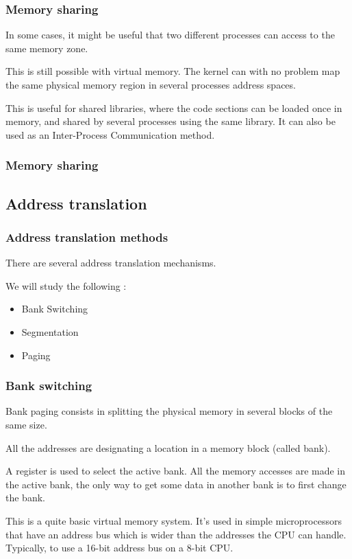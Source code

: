 \begin{frame}
  \frametitle{Memory sharing}

  In some cases, it might be useful that two different processes can access to the same memory zone.

  \-

  This is still possible with virtual memory. The kernel can with no problem map the same physical memory region in several processes address spaces.

  \-

  This is useful for shared libraries, where the code sections can be loaded once in memory, and shared by several processes using the same library. It can also be used as an Inter-Process Communication method.

\end{frame}

\begin{frame}
  \frametitle{Memory sharing}

  \begin{center}
  \end{center}

\end{frame}

\subsection{Address translation}

\begin{frame}
  \frametitle{Address translation methods}

  There are several address translation mechanisms.

  \-

  We will study the following :
  \begin{itemize}
  \item Bank Switching
  \item Segmentation
  \item Paging
  \end{itemize}

\end{frame}

\begin{frame}
  \frametitle{Bank switching}

  Bank paging consists in splitting the physical memory in several blocks of the same size.

  \-

  All the addresses are designating a location in a memory block (called bank).

  \-

  A register is used to select the active bank. All the memory accesses are made in the active bank, the only way to get some data in another bank is to first change the bank.

  \-

  This is a quite basic virtual memory system. It's used in simple microprocessors that have an address bus which is wider than the addresses the CPU can handle. Typically, to use a 16-bit address bus on a 8-bit CPU.

\end{frame}

